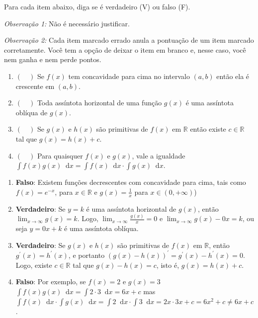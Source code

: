 \documentclass[12pt,a4paper]{article}
\newcommand*\diff{\mathop{}\!\mathrm{d}}
\newcommand*\R{\mathbb{R}}
\begin{document}
\begin{ExerciseList}
\Exercise[title={2,0}] Para cada item abaixo, diga se é verdadeiro (V) ou falso (F).

\emph{Observação 1:} Não é necessário justificar.

\emph{Observação 2:} Cada item marcado errado anula a pontuação de um item marcado corretamente. Você tem a opção de deixar o item em branco e, nesse caso, você nem ganha e nem perde pontos.

\begin{enumerate}
    \item $\boldsymbol{\left(\quad\right)}$ Se $f(x)$ tem concavidade para cima no intervalo $(a, b)$ então ela é crescente em $(a, b)$.
    \item $\boldsymbol{\left(\quad\right)}$ Toda assíntota horizontal de uma função $g(x)$ é uma assíntota oblíqua de $g(x)$.
    \item $\boldsymbol{\left(\quad\right)}$ Se $g(x)$ e $h(x)$ são primitivas de $f(x)$ em $\R$ então existe $c \in \R$ tal que $g(x) = h(x) + c$.
    \item $\boldsymbol{\left(\quad\right)}$ Para quaisquer $f(x)$ e $g(x)$, vale a igualdade $\int f(x) g(x) \diff{x} = \int f(x) \diff{x} \cdot \int g(x) \diff{x}$.
\end{enumerate}

\Answer \begin{enumerate}
    \item \textbf{Falso}: Existem funções decrescentes com concavidade para cima, tais como $f(x) = e^{-x}$, para $x \in \R$ e $g(x) = \frac{1}{x}$ para $x \in (0, +\infty)$)
    \item \textbf{Verdadeiro}: Se $y=k$ é uma assíntota horizontal de $g(x)$, então $\lim_{x\to\infty} g(x) = k$. Logo, $\lim_{x\to \infty} \frac{g(x)}{x} = 0$ e $\lim_{x\to \infty} g(x) - 0 x = k$, ou seja $y=0x + k$ é uma assíntota oblíqua.
    \item \textbf{Verdadeiro}: Se $g(x)$ e $h(x)$ são primitivas de $f(x)$ em $\R$, então $g^\prime(x) = h^\prime(x)$, e portanto $(g(x) - h(x))^\prime = g^\prime(x) - h^\prime(x) = 0$. Logo, existe $c \in \R$ tal que $g(x) - h(x) = c$, isto é, $g(x) = h(x) + c$.
    \item \textbf{Falso}: Por exemplo, se $f(x) = 2$ e $g(x) = 3$ $\int f(x) g(x) \diff{x} = \int 2\cdot 3 \diff{x} = 6x + c$ mas $\int f(x) \diff{x} \cdot \int g(x) \diff{x} = \int 2 \diff{x} \cdot \int 3 \diff{x} = 2x \cdot 3x + c = 6x^2 + c \neq 6x + c$.
\end{enumerate}


\end{ExerciseList}
\end{document}
